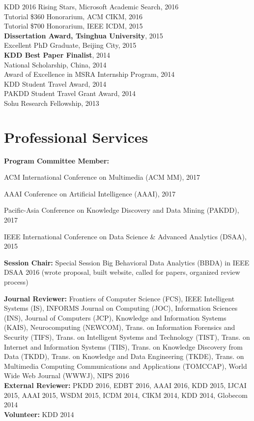 \documentclass[margin, 10pt]{res}
\begin{document}
\begin{resume}
{KDD 2016 Rising Stars, Microsoft Academic Search}, 2016 \\
{Tutorial \$360 Honorarium, ACM CIKM}, 2016 \\
{Tutorial \$700 Honorarium, IEEE ICDM}, 2015 \\
\textbf{Dissertation Award, Tsinghua University}, 2015 \\
{Excellent PhD Graduate, Beijing City}, 2015 \\
\textbf{KDD Best Paper Finalist}, 2014 \\
{National Scholarship, China}, 2014 \\
{Award of Excellence in MSRA Internship Program}, 2014 \\
{KDD Student Travel Award}, 2014 \\
{PAKDD Student Travel Grant Award}, 2014 \\
{Sohu Research Fellowship}, 2013


\section{Professional Services}

\textbf{Program Committee Member:}
\begin{compactitem}
\item ACM International Conference on Multimedia (ACM MM), 2017
\item AAAI Conference on Artificial Intelligence (AAAI), 2017
\item Pacific-Asia Conference on Knowledge Discovery and Data Mining (PAKDD), 2017
\item IEEE International Conference on Data Science \& Advanced Analytics (DSAA), 2015
\end{compactitem}

\textbf{Session Chair:}
Special Session Big Behavioral Data Analytics (BBDA) in IEEE DSAA 2016
(wrote proposal, built website, called for papers, organized review process)

\textbf{Journal Reviewer:}
Frontiers of Computer Science (FCS),
IEEE Intelligent Systems (IS),
INFORMS Journal on Computing (JOC),
Information Sciences (INS),
Journal of Computers (JCP),
Knowledge and Information Systems (KAIS),
Neurocomputing (NEWCOM),
Trans. on Information Forensics and Security (TIFS),
Trans. on Intelligent Systems and Technology (TIST),
Trans. on Internet and Information Systems (TIIS),
Trans. on Knowledge Discovery from Data (TKDD),
Trans. on Knowledge and Data Engineering (TKDE),
Trans. on Multimedia Computing Communications and Applications (TOMCCAP),
World Wide Web Journal (WWWJ), NIPS 2016 \\
\textbf{External Reviewer:} PKDD 2016, EDBT 2016, AAAI 2016, KDD 2015, IJCAI 2015, AAAI 2015,
WSDM 2015, ICDM 2014, CIKM 2014, KDD 2014, Globecom 2014 \\
\textbf{Volunteer:} KDD 2014


\end{resume}
\end{document}
